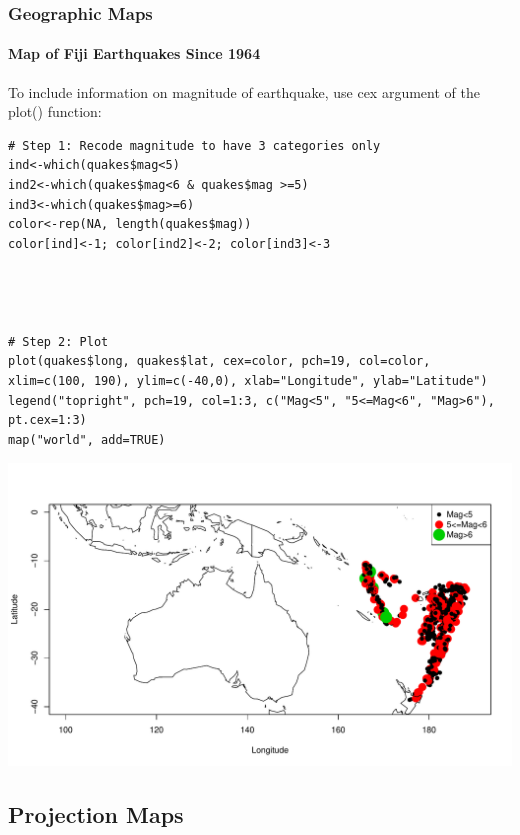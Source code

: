 \begin{frame}
\frametitle{Geographic Maps}
  \framesubtitle{Map of Fiji Earthquakes Since 1964}

To include information on magnitude of earthquake, use \ttfamily cex \normalfont argument of the \ttfamily plot() \normalfont function:
\begin{lstlisting}
# Step 1: Recode magnitude to have 3 categories only
ind<-which(quakes$mag<5)
ind2<-which(quakes$mag<6 & quakes$mag >=5)
ind3<-which(quakes$mag>=6)
color<-rep(NA, length(quakes$mag))
color[ind]<-1; color[ind2]<-2; color[ind3]<-3




# Step 2: Plot
plot(quakes$long, quakes$lat, cex=color, pch=19, col=color, xlim=c(100, 190), ylim=c(-40,0), xlab="Longitude", ylab="Latitude")
legend("topright", pch=19, col=1:3, c("Mag<5", "5<=Mag<6", "Mag>6"), pt.cex=1:3)
map("world", add=TRUE)
\end{lstlisting}

\newpage
       \begin{center}
		\includegraphics[scale=0.42]{images/fujiColor.pdf}
	\end{center}

\end{frame}


\subsection{Projection Maps}

